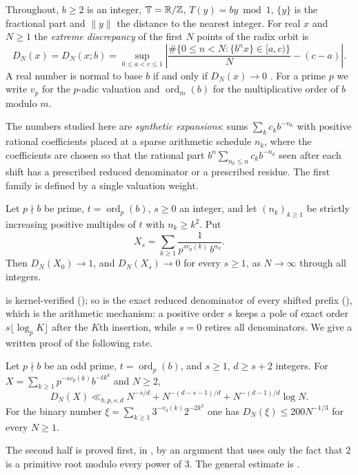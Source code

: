 \documentclass[11pt]{article}
\newcommand{\dist}[1]{\lVert #1\rVert}
\newcommand{\fr}[1]{\{#1\}}
\DeclareMathOperator{\ord}{ord}
\begin{document}
Throughout, $b\ge2$ is an integer, $\mathbb T=\mathbb R/\mathbb Z$, $T(y)=by\bmod 1$, $\fr{y}$ is the fractional part
and $\dist{y}$ the distance to the nearest integer. For real $x$ and $N\ge1$ the \emph{extreme
discrepancy} of the first $N$ points of the radix orbit is
\[
D_N(x)=D_N(x;b)=\sup_{0\le a<c\le 1}\left|\frac{\#\{0\le n<N:\fr{b^nx}\in[a,c)\}}{N}-(c-a)\right|.
\]
A real number is normal to base $b$ if and only if $D_N(x)\to0$ \cite[Chapter~1, Theorem~8.1,
p.~70 and Chapter~2, Theorem~1.1, p.~89]{KN}. For a prime $p$ we write $v_p$ for the $p$-adic
valuation and $\ord_m(b)$ for the multiplicative order of $b$ modulo $m$.

The numbers studied here are \emph{synthetic expansions}: sums $\sum_k c_kb^{-n_k}$ with
positive rational coefficients placed at a sparse arithmetic schedule $n_k$, where the coefficients
are chosen so that the rational part $b^n\sum_{n_k\le n}c_kb^{-n_k}$ seen after each shift has a
prescribed reduced denominator or a prescribed residue. The first family is defined by a single
valuation weight.

\begin{maintheorem}\label{thm:A}
Let $p\nmid b$ be prime, $t=\ord_p(b)$, $s\ge0$ an integer, and let $(n_k)_{k\ge1}$ be strictly
increasing positive multiples of $t$ with $n_k\ge k^2$. Put
\[
X_s=\sum_{k\ge1}\frac{1}{p^{s v_p(k)}\,b^{n_k}}.
\]
Then $D_N(X_0)\to1$, and $D_N(X_s)\to0$ for every $s\ge1$, as $N\to\infty$ through all integers.
\end{maintheorem}

 is kernel-verified (); so is the exact reduced denominator of every
shifted prefix (), which is the arithmetic mechanism: a positive order $s$ keeps a
pole of exact order $s\lfloor\log_pK\rfloor$ after the $K$th insertion, while $s=0$ retires all
denominators. We give a written proof of the following rate.

\begin{maintheorem}\label{thm:B}
Let $p\nmid b$ be an odd prime, $t=\ord_p(b)$, and $s\ge1$, $d\ge s+2$ integers. For
$X=\sum_{k\ge1}p^{-sv_p(k)}b^{-tk^d}$ and $N\ge2$,
\[
D_N(X)\ll_{b,p,s,d} N^{-s/d}+N^{-(d-s-1)/d}+N^{-(d-1)/d}\log N .
\]
For the binary number $\xi=\sum_{k\ge1}3^{-v_3(k)}2^{-2k^3}$ one has $D_N(\xi)\le 200N^{-1/3}$
for every $N\ge1$.
\end{maintheorem}

The second half is proved first, in , by an argument that uses only the fact
that $2$ is a primitive root modulo every power of $3$. The general estimate is .
\end{document}

